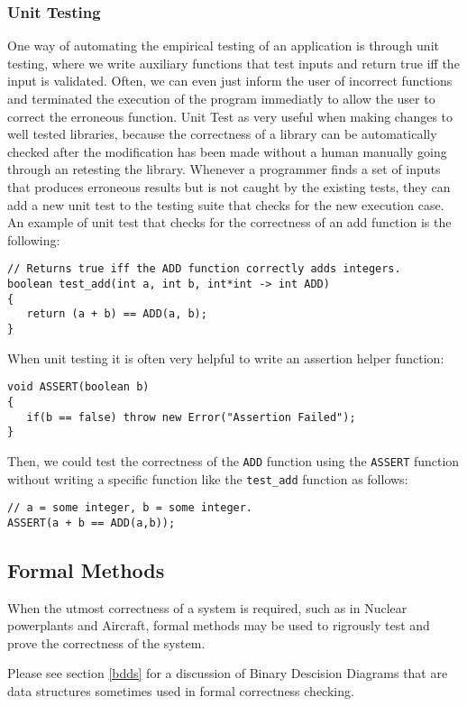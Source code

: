 \documentclass[12pt, letterpaper]{book}
\begin{document}
			\subsubsection{Unit Testing}

	One way of automating the empirical testing of an application is through unit testing, where we write auxiliary functions that test inputs and return true iff the input is validated. Often, we can even just inform the user of incorrect functions and terminated the execution of the program immediatly to allow the user to correct the erroneous function. Unit Test as very useful when making changes to well tested libraries, because the correctness of a library can be automatically checked after the modification has been made without a human manually going through an retesting the library. Whenever a programmer finds a set of inputs that produces erroneous results but is not caught by the existing tests, they can add a new unit test to the testing suite that checks for the new execution case.
	An example of unit test that checks for the correctness of an add function is the following:
\begin{verbatim}
// Returns true iff the ADD function correctly adds integers.
boolean test_add(int a, int b, int*int -> int ADD)
{
   return (a + b) == ADD(a, b); 
}
\end{verbatim}

When unit testing it is often very helpful to write an assertion helper function:
\begin{verbatim}
void ASSERT(boolean b)
{
   if(b == false) throw new Error("Assertion Failed");
}
\end{verbatim}

Then, we could test the correctness of the \texttt{ADD} function using the \texttt{ASSERT} function without writing a specific function like the \texttt{test\_add} function as follows:
\begin{verbatim}
// a = some integer, b = some integer.
ASSERT(a + b == ADD(a,b));
\end{verbatim}

	\subsection{Formal Methods}
	When the utmost correctness of a system is required, such as in Nuclear powerplants and Aircraft, formal methods may be used to rigrously test and prove the correctness of the system.

		Please see section \ref{bdds} for a discussion of Binary Descision Diagrams that are data structures sometimes used in formal correctness checking.
\end{document}
